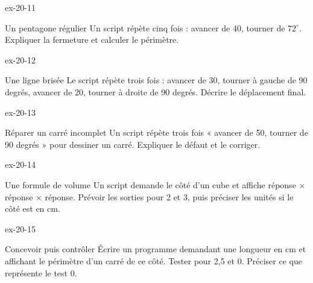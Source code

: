 \begin{blocLivre}{ex-20-11}\begin{exercice}[3]{Un pentagone régulier}
Un script répète cinq fois : avancer de 40, tourner de $72^\circ$. Expliquer la fermeture et calculer le périmètre.
\label{fig-ex-20-11}
\end{exercice}\end{blocLivre}
\begin{blocLivre}{ex-20-12}\begin{exercice}[3]{Une ligne brisée}
Le script répète trois fois : avancer de 30, tourner à gauche de 90 degrés, avancer de 20, tourner à droite de 90 degrés. Décrire le déplacement final.
\label{fig-ex-20-12}
\end{exercice}\end{blocLivre}
\begin{blocLivre}{ex-20-13}\begin{exercice}[3]{Réparer un carré incomplet}
Un script répète trois fois « avancer de 50, tourner de 90 degrés » pour dessiner un carré. Expliquer le défaut et le corriger.
\label{fig-ex-20-13}
\end{exercice}\end{blocLivre}
\begin{blocLivre}{ex-20-14}\begin{exercice}[3]{Une formule de volume}
Un script demande le côté d’un cube et affiche réponse × réponse × réponse. Prévoir les sorties pour 2 et 3, puis préciser les unités si le côté est en cm.
\label{fig-ex-20-14}
\end{exercice}\end{blocLivre}
\begin{blocLivre}{ex-20-15}\begin{exercice}[3]{Concevoir puis contrôler}
Écrire un programme demandant une longueur en cm et affichant le périmètre d’un carré de ce côté. Tester pour 2,5 et 0. Préciser ce que représente le test 0.
\label{fig-ex-20-15}
\end{exercice}\end{blocLivre}

\clearpage
